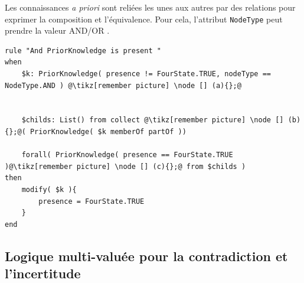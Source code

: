 \begin{refsegment}
Les connaissances \textit{a priori} sont reliées les unes aux autres par des relations pour exprimer la composition et l'équivalence. Pour cela, l'attribut \texttt{NodeType} peut prendre la valeur AND/OR .

\begin{lstlisting}[caption=Inférence de la prédiction de présence à travers les connaissances, style=drl-style]
rule "And PriorKnowledge is present "
when
	$k: PriorKnowledge( presence != FourState.TRUE, nodeType == NodeType.AND ) @\tikz[remember picture] \node [] (a){};@
	
    
	$childs: List() from collect @\tikz[remember picture] \node [] (b){};@( PriorKnowledge( $k memberOf partOf )) 
	
	forall( PriorKnowledge( presence == FourState.TRUE )@\tikz[remember picture] \node [] (c){};@ from $childs ) 
then
	modify( $k ){
		presence = FourState.TRUE
	}
end
\end{lstlisting}

\subsection{Logique multi-valuée pour la contradiction et l'incertitude}


\end{refsegment}
